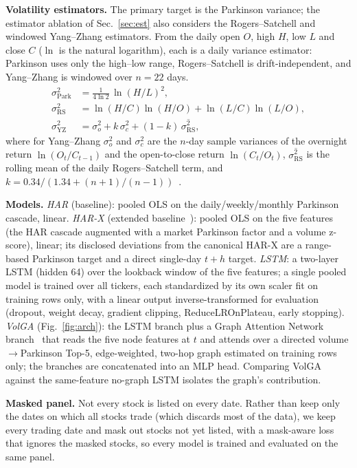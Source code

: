 \documentclass[runningheads]{llncs}
\begin{document}
\textbf{Volatility estimators.} The primary target is the Parkinson variance; the estimator ablation
of Sec.~\ref{sec:est} also considers the Rogers--Satchell and windowed Yang--Zhang estimators. From
the daily open $O$, high $H$, low $L$ and close $C$ ($\ln$ is the natural logarithm), each is a daily
variance estimator: Parkinson uses only the high--low range, Rogers--Satchell is drift-independent,
and Yang--Zhang is windowed over $n{=}22$ days.
\begin{align*}
\sigma^2_{\mathrm{Park}} &= \tfrac{1}{4\ln 2}\,\ln(H/L)^2,\\
\sigma^2_{\mathrm{RS}} &= \ln(H/C)\ln(H/O)+\ln(L/C)\ln(L/O),\\
\sigma^2_{\mathrm{YZ}} &= \sigma^2_{o}+k\,\sigma^2_{c}+(1-k)\,\overline{\sigma^2_{\mathrm{RS}}},
\end{align*}
where for Yang--Zhang $\sigma^2_{o}$ and $\sigma^2_{c}$ are the $n$-day sample variances of the
overnight return $\ln(O_t/C_{t-1})$ and the open-to-close return $\ln(C_t/O_t)$,
$\overline{\sigma^2_{\mathrm{RS}}}$ is the rolling mean of the daily Rogers--Satchell term, and
$k=0.34/(1.34+(n{+}1)/(n{-}1))$~\cite{yangzhang2000,rogers1991}.

\textbf{Models.} \emph{HAR} (baseline): pooled OLS on the daily/weekly/monthly Parkinson cascade,
linear. \emph{HAR-X} (extended baseline~\cite{corsi2009,clements2024}): pooled OLS on the five
features (the HAR cascade augmented with a market Parkinson factor and a volume z-score), linear;
its disclosed deviations from the canonical HAR-X are a range-based Parkinson target and a direct
single-day $t{+}h$ target. \emph{LSTM}: a two-layer LSTM (hidden 64) over the lookback window of the
five features; a single pooled model is trained over all tickers, each standardized by its own scaler
fit on training rows only, with a linear output inverse-transformed for evaluation (dropout, weight
decay, gradient clipping, ReduceLROnPlateau, early stopping). \emph{VolGA} (Fig.~\ref{fig:arch}): the
LSTM branch plus a Graph Attention Network branch~\cite{gat2018} that reads the five node features at
$t$ and attends over a directed volume$\to$Parkinson Top-5, edge-weighted, two-hop graph estimated on
training rows only; the branches are concatenated into an MLP head. Comparing VolGA against the
same-feature no-graph LSTM isolates the graph's contribution.

\textbf{Masked panel.} Not every stock is listed on every date. Rather than keep only the dates on
which all stocks trade (which discards most of the data), we keep every trading date and mask out
stocks not yet listed, with a mask-aware loss that ignores the masked stocks, so every model is
trained and evaluated on the same panel.
\end{document}
